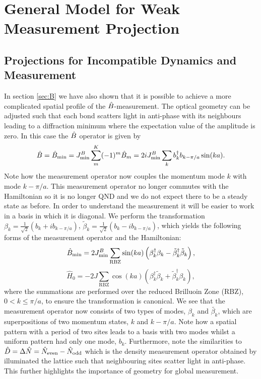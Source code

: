 \section{General Model for Weak Measurement Projection}

\subsection{Projections for Incompatible Dynamics and Measurement}

In section \ref{sec:B} we have also shown that it is possible to
achieve a more complicated spatial profile of the
$\hat{B}$-measurement. The optical geometry can be adjusted such that each
bond scatters light in anti-phase with its neighbours leading to a
diffraction minimum where the expectation value of the amplitude is
zero. In this case the $\hat{B}$ operator is given by
\begin{equation}
  \hat{B} = \hat{B}_\mathrm{min} = J^B_\mathrm{min} \sum_m^K (-1)^m \hat{B}_m
  = 2 i J^B_\mathrm{min} \sum_k b^\dagger_k b_{k - \pi/a} \sin(ka).
\end{equation}
Note how the measurement operator now couples the momentum mode $k$
with mode $k - \pi/a$. This measurement operator no longer commutes
with the Hamiltonian so it is no longer QND and we do not expect there
to be a steady state as before. In order to understand the measurement
it will be easier to work in a basis in which it is diagonal. We
perform the transformation
$\beta_k = \frac{1}{\sqrt{2}} \left( b_k + i b_{k - \pi/a} \right)$,
$\tilde{\beta}_k = \frac{1}{\sqrt{2}} \left( b_k - i b_{k - \pi/a}
\right)$, which yields the following forms of the measurement operator
and the Hamiltonian:
\begin{equation}
  \label{eq:BminBeta}
  \hat{B}_\mathrm{min} = 2 J^B_\mathrm{min} \sum_{\mathrm{RBZ}} \sin(ka) \left( \beta^\dagger_k
    \beta_k - \tilde{\beta}_k^\dagger \tilde{\beta}_k \right),
\end{equation}
\begin{equation}
  \label{eq:H0Beta}
  \hat{H}_0 = - 2 J \sum_{\mathrm{RBZ}} \cos(ka) \left( \beta_k^\dagger
    \tilde{\beta}_k + \tilde{\beta}^\dagger_k \beta_k \right),
\end{equation}
where the summations are performed over the reduced Brilluoin Zone
(RBZ), $0 < k \le \pi/a$, to ensure the transformation is
canonical. We see that the measurement operator now consists of two
types of modes, $\beta_k$ and $\tilde{\beta_k}$, which are
superpositions of two momentum states, $k$ and $k - \pi/a$. Note how a
spatial pattern with a period of two sites leads to a basis with two
modes whilst a uniform pattern had only one mode, $b_k$. Furthermore,
note the similarities to
$\hat{D} = \Delta \hat{N} = \hat{N}_\mathrm{even} - \hat{N}_\mathrm{odd}$
which is the density measurement operator obtained by illuminated the
lattice such that neighbouring sites scatter light in anti-phase. This
further highlights the importance of geometry for global measurement.

